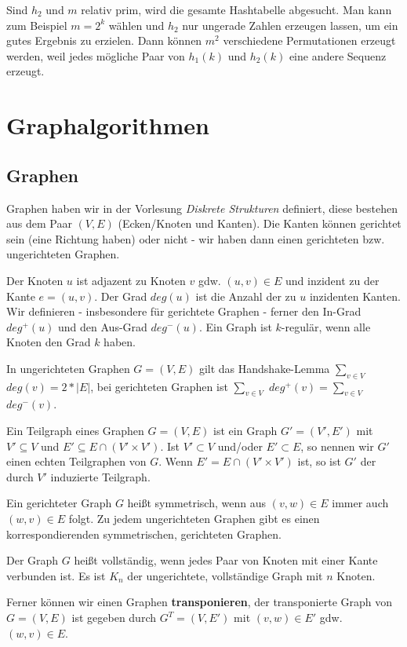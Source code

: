 \documentclass[12pt]{article}
\begin{document}
Sind $h_2$ und $m$ relativ prim, wird die gesamte Hashtabelle abgesucht. Man kann zum Beispiel $m = 2^k$ wählen und $h_2$ nur ungerade Zahlen erzeugen lassen, um ein gutes Ergebnis zu erzielen. Dann können $m^2$ verschiedene Permutationen erzeugt werden, weil jedes mögliche Paar von $h_1(k)$ und $h_2(k)$ eine andere Sequenz erzeugt.

\section{Graphalgorithmen}

\subsection{Graphen}

Graphen haben wir in der Vorlesung \textit{Diskrete Strukturen} definiert, diese bestehen aus dem Paar $(V, E)$ (Ecken/Knoten und Kanten). Die Kanten können gerichtet sein (eine Richtung haben) oder nicht - wir haben dann einen gerichteten bzw. ungerichteten Graphen.

Der Knoten $u$ ist adjazent zu Knoten $v$ gdw. $(u,v) \in E$ und inzident zu der Kante $e = (u,v)$. Der Grad $deg(u)$ ist die Anzahl der zu $u$ inzidenten Kanten. Wir definieren - insbesondere für gerichtete Graphen - ferner den In-Grad $deg^+(u)$ und den Aus-Grad $deg^-(u)$. Ein Graph ist $k$-regulär, wenn alle Knoten den Grad $k$ haben.

In ungerichteten Graphen $G = (V, E)$ gilt das Handshake-Lemma $\sum_{v \in V}$ $deg(v) = 2*|E|$, bei gerichteten Graphen ist $\sum_{v \in V}$ $deg^+(v) = \sum_{v \in V}$ $deg^-(v)$.

Ein Teilgraph eines Graphen $G = (V, E)$ ist ein Graph $G' = (V', E')$ mit $V' \subseteq V$ und $E' \subseteq E \cap (V' \times V')$. Ist $V' \subset V$ und/oder $E' \subset E$, so nennen wir $G'$ einen echten Teilgraphen von $G$. Wenn $E' = E \cap (V' \times V')$ ist, so ist $G'$ der durch $V'$ induzierte Teilgraph.

Ein gerichteter Graph $G$ heißt symmetrisch, wenn aus $(v,w) \in E$ immer auch $(w,v) \in E$ folgt. Zu jedem ungerichteten Graphen gibt es einen korrespondierenden symmetrischen, gerichteten Graphen.

Der Graph $G$ heißt vollständig, wenn jedes Paar von Knoten mit einer Kante verbunden ist. Es ist $K_n$ der ungerichtete, vollständige Graph mit $n$ Knoten.

Ferner können wir einen Graphen \textbf{transponieren}, der transponierte Graph von $G = (V, E)$ ist gegeben durch $G^T = (V, E')$ mit $(v, w) \in E'$ gdw. $(w, v) \in E$.
\end{document}
